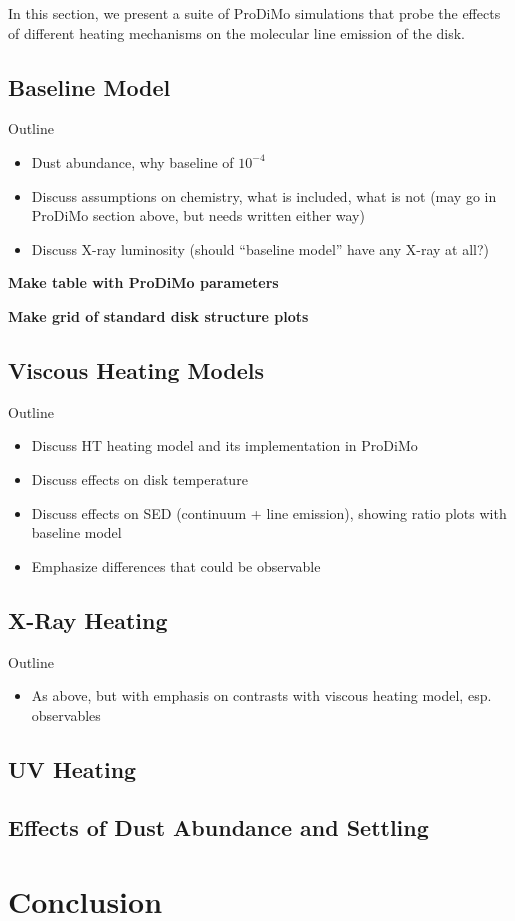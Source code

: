 \documentclass[12pt,preprint]{aastex}
\newcommand{\remark}[1]{{\color{red}\bf#1}} %
\begin{document}
In this section, we present a suite of ProDiMo simulations that probe
the effects of different heating mechanisms on the molecular line
emission of the disk. 

\subsection{Baseline Model}

Outline
\begin{itemize}
\item Dust abundance, why baseline of $10^{-4}$
\item Discuss assumptions on chemistry, what is included, what is not
  (may go in ProDiMo section above, but needs written either way)
\item Discuss X-ray luminosity (should ``baseline model'' have any
  X-ray at all?)
\end{itemize}

\remark{Make table with ProDiMo parameters}

\remark{Make grid of standard disk structure plots}

\subsection{Viscous Heating Models}

Outline
\begin{itemize}
\item Discuss HT heating model and its implementation in ProDiMo
\item Discuss effects on disk temperature
\item Discuss effects on SED (continuum + line emission), showing ratio plots with
  baseline model
\item Emphasize differences that could be observable
\end{itemize}

\subsection{X-Ray Heating}

Outline
\begin{itemize}
\item As above, but with emphasis on contrasts with viscous heating
  model, esp. observables
\end{itemize}

\subsection{UV Heating}

\subsection{Effects of Dust Abundance and Settling}

\section{Conclusion}




\end{document}
